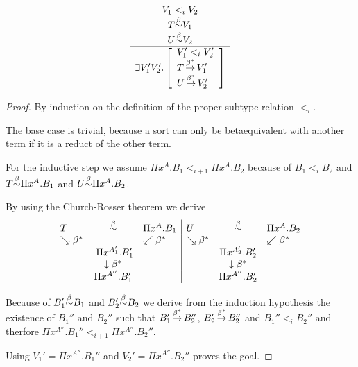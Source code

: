 \begin{theorem}
    \label {thm:SubtypeEquivalence}
    $$
    \begin{array}{c} 
        V_1 <_i V_2
        \\
        T {\stackrel{\beta}{\sim}} V_1
        \\
        U {\stackrel{\beta}{\sim}} V_2
     \\ \hline 
        \exists V_1' V_2'.
        \left[ \begin{array}{l} 
            V_1' <_i V_2'
            \\
            T {\,\stackrel{\beta^*}{\to}\,} V_1'
            \\
            U {\,\stackrel{\beta^*}{\to}\,} V_2'
         \end{array} \right]
    \end{array}
    $$
    \begin{proof}
        By induction on the definition of the proper subtype relation
        $<_i$.

        The base case is trivial, because a sort can only be betaequivalent with
        another term if it is a reduct of the other term.

        For the inductive step we assume $\Pi x^A. B_1 <_{i+1} \Pi x^A. B_2$
        because of $B_1 <_i B_2$ and $T {\stackrel{\beta}{\sim}} \Pi x^A. B_1$ and $U {\stackrel{\beta}{\sim}} \Pi
        x^A. B_2$.

        By using the Church-Rosser theorem we derive
        $$
        \begin{array}{lcl|lcl}
            T & \betaeq & \Pi x^A.B_1 &
            U & \betaeq & \Pi x^A. B_2
            \\
            \searrow\beta^* & & \swarrow\beta^* &
            \searrow\beta^* & & \swarrow\beta^*
            \\
            & \Pi x^{A_1'}.B_1' & &
            & \Pi x^{A_2'}.B_2'
            \\
            & \downarrow\beta^* & & & \downarrow\beta^*
            \\
            & \Pi x^{A''}. B_1' & &
            & \Pi x^{A''}. B_2'
        \end{array}
        $$

        Because of $B_1' {\stackrel{\beta}{\sim}} B_1$ and $B_2' {\stackrel{\beta}{\sim}} B_2$ we derive from the
        induction hypothesis the existence of $B_1''$ and
        $B_2''$ such that $B_1' {\,\stackrel{\beta^*}{\to}\,} B_2''$, $B_2' {\,\stackrel{\beta^*}{\to}\,} B_2''$ and
        $B_1'' <_i B_2''$ and therfore $\Pi x^{A''}.B_1'' <_{i+1} \Pi x^{A''}.
        B_2''$.

        Using $V_1' = \Pi x^{A''}. B_1''$ and $V_2' = \Pi x^{A''}. B_2''$ proves
        the goal.
    \end{proof}
\end{theorem}



